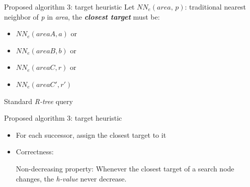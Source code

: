 \begin{frame}{Proposed algorithm 3: target heuristic}
\small{
Let $NN_e(\textit{area, p})$: traditional nearest neighbor of \textit{p} in \textit{area}, the \textbf{\textit{closest target}} must be:
}
\begin{minipage}{.33\textwidth}
    \begin{itemize}
        \item {} {\small{$NN_e(areaA, a)$ or}}
        \item {} {\small{$NN_e(areaB, b)$ or}}
        \item {} {\small{$NN_e(areaC, r)$ or}}
        \item {} {\small{$NN_e(areaC', r')$}}
    \end{itemize}
\end{minipage}%
\begin{minipage}{.66\textwidth}
    \begin{adjustbox}{max totalsize={\textwidth}{\textheight}, right}
    \end{adjustbox}
\end{minipage}

 \small{Standard \textit{R-tree} query}
\end{frame}

\begin{frame}{Proposed algorithm 3: target heuristic}
\begin{minipage}{.9\textwidth}
\begin{itemize}
     \item \small{
        For each successor, assign the closest target to it
    }
     \item \small {
    Correctness:
    \begin{lemma}{Non-decreasing property:}
        Whenever the closest target of a search node changes,
        the \textit{h-value} never decrease.
    \end{lemma}
    }
\end{itemize}
\end{minipage}%
\end{frame}

